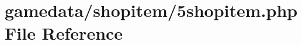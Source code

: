 \hypertarget{5shopitem_8php}{\section{gamedata/shopitem/5shopitem.php File Reference}
\label{5shopitem_8php}
}
